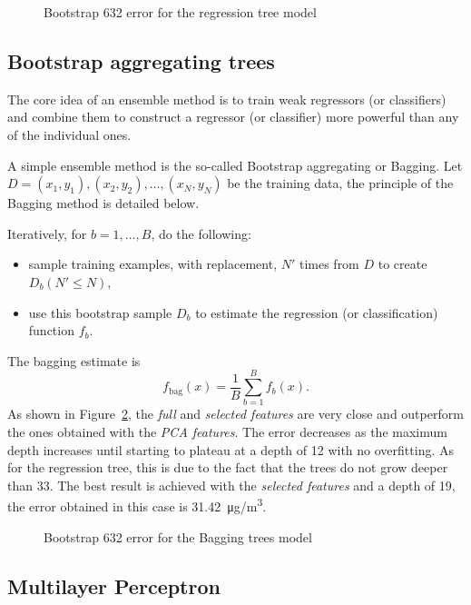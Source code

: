 \documentclass[journal,11pt]{IEEEtran}
\begin{document}
\begin{figure}[H]
    \centering
    
    \caption{Bootstrap 632 error for the regression tree model}
    \label{fig:tree}
\end{figure}


\subsection{Bootstrap aggregating trees}

The core idea of an ensemble method is to train weak regressors (or classifiers) and combine them to construct a regressor (or classifier) more powerful than any of the individual ones.

A simple ensemble method is the so-called Bootstrap aggregating or Bagging. Let $D = { (x_1 , y_1 ),(x_2 , y_2 ),\ldots,(x_N , y_N ) }$ be the training data, the principle of the Bagging method is detailed below.

Iteratively, for $b = 1,\ldots,B$, do the following: 
\begin{itemize}
    \item sample training examples, with replacement, $N'$ times from $D$ to create $D_b (N' \leq N)$,
    \item use this bootstrap sample $D_b$ to estimate the regression (or classification) function $f_b$.
\end{itemize}
The bagging estimate is $$f_{\text{bag}}(x) = \frac{1}{B} \sum_{b=1}^B f_b(x).$$
As shown in Figure~\ref{fig:boost_tree}, the \textit{full} and \textit{selected features} are very close and outperform the ones obtained with the \textit{PCA features}. The error decreases as the maximum depth increases until starting to plateau at a depth of 12 with no overfitting. As for the regression tree, this is due to the fact that the trees do not grow deeper than 33. The best result is achieved with the \textit{selected features} and a depth of 19, the error obtained in this case is \SI{31.42}{\micro g/m^3}.

\begin{figure}[H]
    \centering
    
    \caption{Bootstrap 632 error for the Bagging trees model}
    \label{fig:boost_tree}
\end{figure}

\subsection{Multilayer Perceptron}
\end{document}
